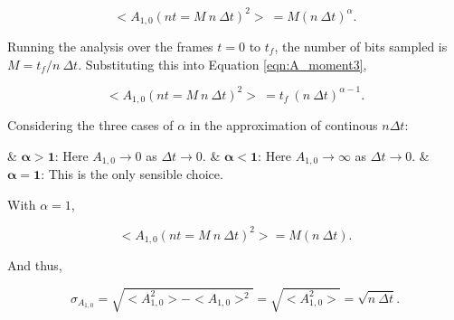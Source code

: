 \begin{description}
					\begin{equation}
						<A_{1,0}(nt = M\ n\ \Delta t)^2>\ = M (n\ \Delta t)^\alpha.
						\label{eqn:A_moment3}
					\end{equation}

					Running the analysis over the frames $t = 0$ to $t_f$, the number of bits sampled is $M = {t_f / n\ \Delta t}$. Substituting this into Equation \ref{eqn:A_moment3},

					\begin{equation}
						<A_{1,0}(nt = M\ n\ \Delta t)^2>\ = t_f\ (n\ \Delta t)^{\alpha -1}.
					\end{equation}

					Considering the three cases of $\alpha$ in the approximation of continous $n \Delta t$:
					
					\vspace{1em}

					\begin{easylist}[itemize]
						& $\bm{\alpha > 1}$: Here $A_{1,0} \to 0$ as $\Delta t \to 0$.
						& $\bm{\alpha < 1}$: Here $A_{1,0} \to \infty$ as $\Delta t \to 0$.
						& $\bm{\alpha = 1}$: This is the only sensible choice.
					\end{easylist}
					
					\vspace{1em}

					With $\alpha =1$,

					\begin{equation}
						<A_{1,0}(nt = M\ n\ \Delta t)^2> = M (n\ \Delta t).
					\end{equation}

					And thus,

					\begin{equation}
						\sigma_{A_{1,0}} = \sqrt{<A_{1,0}^2> - <A_{1,0}>^2} = \sqrt{<A_{1,0}^2>} = \sqrt{n\ \Delta t}.
					\end{equation}

			\end{description}	

